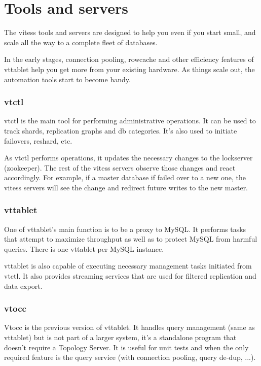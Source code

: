 \section{Tools and servers}\hypertarget{tools-and-servers}{}\label{tools-and-servers}

The vitess tools and servers are designed to help you even
if you start small, and scale all the way to a complete fleet
of databases.

In the early stages, connection pooling, rowcache and other
efficiency features of vttablet help you get more from your
existing hardware.
As things scale out, the automation tools start to become handy.

\subsubsection{vtctl}\hypertarget{vtctl}{}\label{vtctl}

vtctl is the main tool for performing administrative operations.
It can be used to track shards, replication graphs and
db categories.
It's also used to initiate failovers, reshard, etc.

As vtctl performs operations, it updates the necessary
changes to the lockserver (zookeeper).
The rest of the vitess servers observe those changes
and react accordingly.
For example, if a master database if failed over to a new
one, the vitess servers will see the change and redirect
future writes to the new master.

\subsubsection{vttablet}\hypertarget{vttablet}{}\label{vttablet}

One of vttablet's main function is to be a proxy to MySQL.
It performs tasks that attempt to maximize throughput as
well as to protect MySQL from harmful queries. There is
one vttablet per MySQL instance.

vttablet is also capable of executing necessary management
tasks initiated from vtctl.
It also provides streaming services that are used for
filtered replication and data export.

\subsubsection{vtocc}\hypertarget{vtocc}{}\label{vtocc}

Vtocc is the previous version of vttablet. It handles query management
(same as vttablet) but is not part of a larger system, it's a standalone
program that doesn't require a Topology Server. It is useful for
unit tests and when the only required feature is the query service
(with connection pooling, query de-dup, ...).

